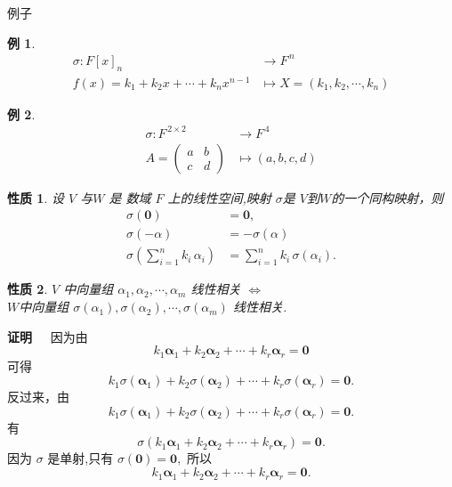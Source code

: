 \documentclass[13pt]{beamer}
\newtheorem{exa}{例}
\newtheorem*{prop}{性质}
\def\pf{{\bf 证明~~ }}
\def\0{\mathbf{0}}
\begin{document}
\begin{frame}{例子}
\begin{exa}
\begin{align*}
\sigma : F[x]_{n}  & \rightarrow F^{\, n}\\
f(x) = k_{1}+k_{2} x+\cdots+k_{n} x^{n-1} &  \mapsto  X=\left(k_{1}, k_{2}, \cdots, k_{n}\right)
\end{align*}
\end{exa}

\begin{exa}
\begin{align*}
\sigma : F^{\, 2 \times 2} &  \rightarrow F^{\, 4}\\
A=\left(\begin{array}{ll}a & b \\ c & d\end{array}\right)
&  \mapsto(a, b, c, d)
\end{align*}
\end{exa}
\end{frame}

\begin{frame}
\begin{prop}
设 $V$ 与$W$ 是   数域 $F$ 上的线性空间,映射 $\sigma$是 $V$到$W$的一个同构映射，则
\begin{align*}
\sigma (\0) & = \0,\\
\sigma (-\alpha) & =-\sigma (\alpha)\\
\sigma \left( \sum_{i=1}^{n} k_{i} \, \alpha_{i}  \right)& =  \sum_{i=1}^{n}   k_{i}\,   \sigma \left( \alpha_{i} \right).
\end{align*}
\end{prop}
\end{frame}


\begin{frame}
\begin{prop} 
	$V$ 中向量组 $\alpha_{1}, \alpha_{2}, \cdots, \alpha_{m}$ 线性相关 
	$\Longleftrightarrow$\\ $W$中向量组 $\sigma\left(\alpha_{1}\right), \sigma\left(\alpha_{2}\right), \cdots, \sigma\left(\alpha_{m}\right)$ 线性相关.
\end{prop}
\pf 因为由
	\[
	k_{1} \boldsymbol{\alpha}_{1}+k_{2} \boldsymbol{\alpha}_{2}+\cdots+k_{r} \boldsymbol{\alpha}_{r}=\boldsymbol{0}
	\]
	可得
	\[
	k_{1} \sigma\left(\boldsymbol{\alpha}_{1}\right)+k_{2} \sigma\left(\boldsymbol{\alpha}_{2}\right)+\cdots+k_{r} \sigma\left(\boldsymbol{\alpha}_{r}\right)=\mathbf{0}.
	\]
	反过来，由
	\[
	k_{1} \sigma\left(\boldsymbol{\alpha}_{1}\right)+k_{2} \sigma\left(\boldsymbol{\alpha}_{2}\right)+\cdots+k_{r} \sigma\left(\boldsymbol{\alpha}_{r}\right)=\mathbf{0}.
	\]
	有
	\[
	\sigma\left(k_{1} \boldsymbol{\alpha}_{1}+k_{2} \boldsymbol{\alpha}_{2}+\cdots+k_{r} \boldsymbol{\alpha}_{r}\right)=\mathbf{0}.
	\]
	因为 $\sigma$ 是单射,只有 $\sigma(\mathbf{0})=\mathbf{0},$ 所以
	\[
	k_{1} \boldsymbol{\alpha}_{1}+k_{2} \boldsymbol{\alpha}_{2}+\cdots+k_{r} \boldsymbol{\alpha}_{r}=\mathbf{0}.
	\]

\end{frame}
\end{document}
